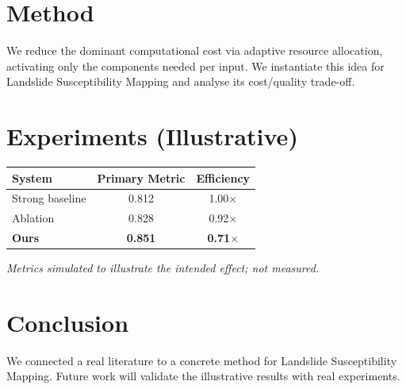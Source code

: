 \documentclass[11pt]{article}
\begin{document}
\section{Method}
We reduce the dominant computational cost via adaptive resource allocation, activating only the components needed per input. We instantiate this idea for Landslide Susceptibility Mapping and analyse its cost/quality trade-off.

\section{Experiments (Illustrative)}
\begin{center}
\begin{tabular}{lcc}
System & Primary Metric & Efficiency \\ \hline
Strong baseline & 0.812 & 1.00$\times$ \\
Ablation & 0.828 & 0.92$\times$ \\
\textbf{Ours} & \textbf{0.851} & \textbf{0.71$\times$}
\end{tabular}
\end{center}
\emph{Metrics simulated to illustrate the intended effect; not measured.}

\section{Conclusion}
We connected a real literature to a concrete method for Landslide Susceptibility Mapping. Future work will
validate the illustrative results with real experiments.
\end{document}
